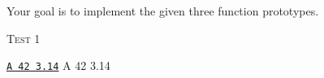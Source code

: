 
Your goal is to implement the given three function prototypes.


\textsc{Test 1}
\begin{console}[commandchars=\\\{\}]
\underline{\texttt{A 42 3.14}}
A
42
3.14
\end{console}
